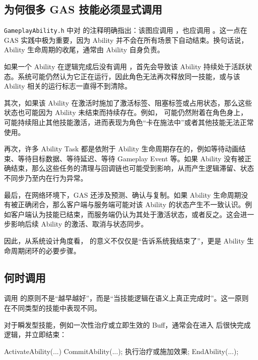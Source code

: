 \subsection{为何很多 GAS 技能必须显式调用 }

\texttt{GameplayAbility.h} 中对  的注释明确指出：该图应调用 ，也应调用 。这一点在 GAS 实践中极为重要，因为 Ability 并不会在所有场景下自动结束。换句话说，Ability 生命周期的收尾，通常由 Ability 自身负责。

如果一个 Ability 在逻辑完成后没有调用 ，首先会导致该 Ability 持续处于活跃状态。系统可能仍然认为它正在运行，因此角色无法再次释放同一技能，或与该 Ability 相关的运行标志一直得不到清除。

其次，如果该 Ability 在激活时施加了激活标签、阻塞标签或占用状态，那么这些状态也可能因为 Ability 未结束而持续存在。例如， 可能仍然附着在角色身上， 可能持续阻止其他技能激活，进而表现为角色“卡在施法中”或者其他技能无法正常使用。

再次，许多 Ability Task 都是依附于 Ability 生命周期存在的，例如等待动画结束、等待目标数据、等待延迟、等待 Gameplay Event 等。如果 Ability 没有被正确结束，那么这些任务的清理与回调链也可能受到影响，从而产生逻辑滞留、状态不同步乃至内在行为异常。

最后，在网络环境下，GAS 还涉及预测、确认与复制。如果 Ability 生命周期没有被正确闭合，那么客户端与服务端可能对该 Ability 的状态产生不一致认识。例如客户端认为技能已结束，而服务端仍认为其处于激活状态，或者反之。这会进一步影响后续 Ability 的激活、取消与状态同步。

因此，从系统设计角度看， 的意义不仅仅是“告诉系统我结束了”，更是 Ability 生命周期闭环的必要步骤。

\subsection{何时调用 }

调用  的原则不是“越早越好”，而是“当技能逻辑在语义上真正完成时”。这一原则在不同类型的技能中表现不同。

对于瞬发型技能，例如一次性治疗或立即生效的 Buff，通常会在进入  后很快完成逻辑，并立即结束：

\begin{code}
	ActivateAbility(...)
	{
		CommitAbility(...);
		执行治疗或施加效果;
		EndAbility(...);
	}
\end{code}

